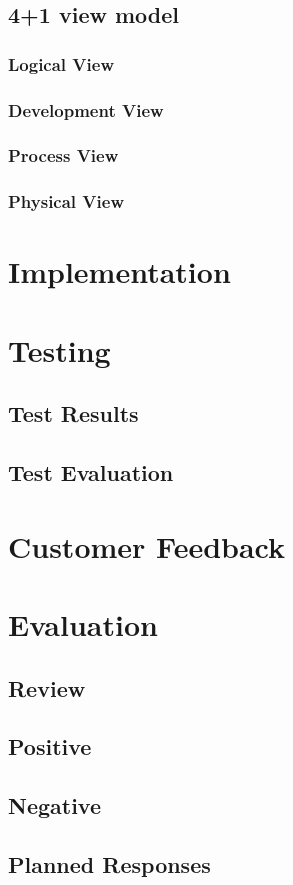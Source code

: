 \subsection{4+1 view model}
\subsubsection{Logical View}
\subsubsection{Development View}
\subsubsection{Process View}
\subsubsection{Physical View}
\section{Implementation}
\section{Testing}
\subsection{Test Results}
\subsection{Test Evaluation}
\section{Customer Feedback}
\section{Evaluation}
\subsection{Review}
\subsection{Positive}
\subsection{Negative}
\subsection{Planned Responses}
